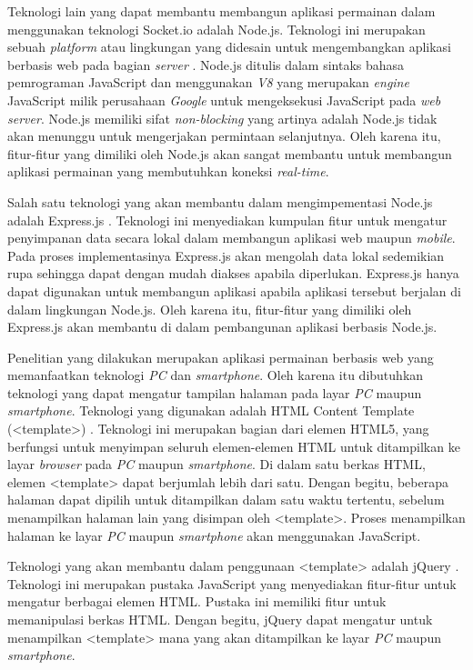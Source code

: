 Teknologi lain yang dapat membantu membangun aplikasi permainan dalam menggunakan teknologi Socket.io adalah Node.js. Teknologi ini merupakan sebuah \textit{platform} atau lingkungan yang didesain untuk mengembangkan aplikasi berbasis web pada bagian \textit{server} \cite{nodeFound:09:nodejsdocs}. Node.js ditulis dalam sintaks bahasa pemrograman JavaScript dan menggunakan \textit{V8} yang merupakan \textit{engine} JavaScript milik perusahaan \textit{Google} untuk mengeksekusi JavaScript pada \textit{web server}. Node.js memiliki sifat \textit{non-blocking} yang artinya adalah Node.js tidak akan menunggu untuk mengerjakan permintaan selanjutnya. Oleh karena itu, fitur-fitur yang dimiliki oleh Node.js akan sangat membantu untuk membangun aplikasi permainan yang membutuhkan koneksi \textit{real-time}.

Salah satu teknologi yang akan membantu dalam mengimpementasi Node.js adalah Express.js \cite{nodeFound:10:expressjsapi}. Teknologi ini menyediakan kumpulan fitur untuk mengatur penyimpanan data secara lokal dalam membangun aplikasi web maupun \textit{mobile}. Pada proses implementasinya Express.js akan mengolah data lokal sedemikian rupa sehingga dapat dengan mudah diakses apabila diperlukan. Express.js hanya dapat digunakan untuk membangun aplikasi apabila aplikasi tersebut berjalan di dalam lingkungan Node.js. Oleh karena itu, fitur-fitur yang dimiliki oleh Express.js akan membantu di dalam pembangunan aplikasi berbasis Node.js.

Penelitian yang dilakukan merupakan aplikasi permainan berbasis web yang memanfaatkan teknologi \textit{PC} dan \textit{smartphone}. Oleh karena itu dibutuhkan teknologi yang dapat mengatur tampilan halaman pada layar \textit{PC} maupun \textit{smartphone}. Teknologi yang digunakan adalah HTML Content Template (<template>) \cite{moz:05:template}. Teknologi ini merupakan bagian dari elemen HTML5, yang berfungsi untuk menyimpan seluruh elemen-elemen HTML untuk ditampilkan ke layar \textit{browser} pada \textit{PC} maupun \textit{smartphone}. Di dalam satu berkas HTML, elemen <template> dapat berjumlah lebih dari satu. Dengan begitu, beberapa halaman dapat dipilih untuk ditampilkan dalam satu waktu tertentu, sebelum menampilkan halaman lain yang disimpan oleh <template>. Proses menampilkan halaman ke layar \textit{PC} maupun \textit{smartphone} akan menggunakan JavaScript.

Teknologi yang akan membantu dalam penggunaan <template> adalah jQuery \cite{jqFound:06:jQueryAPI}. Teknologi ini merupakan pustaka JavaScript yang menyediakan fitur-fitur untuk mengatur berbagai elemen HTML. Pustaka ini memiliki fitur untuk memanipulasi berkas HTML. Dengan begitu, jQuery dapat mengatur untuk menampilkan <template> mana yang akan ditampilkan ke layar \textit{PC} maupun \textit{smartphone}.

